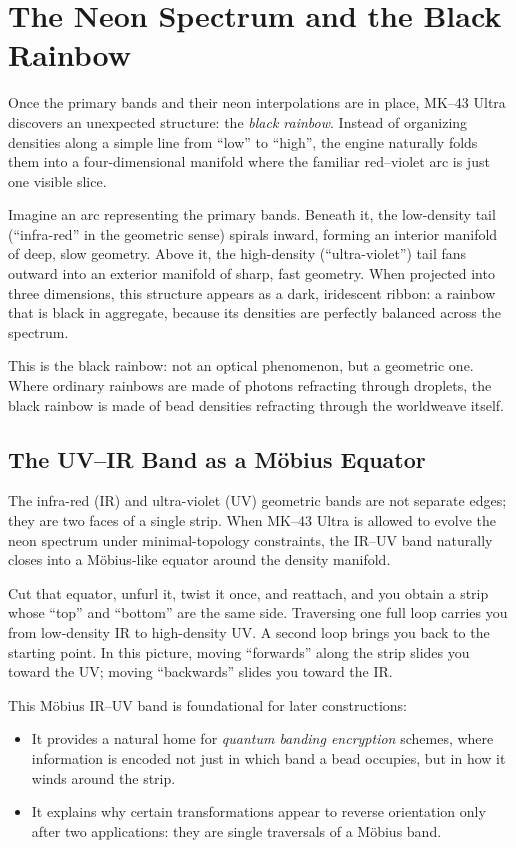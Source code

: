 \chapter{The Neon Spectrum and the Black Rainbow}
Once the primary bands and their neon interpolations are in place, MK--43
Ultra discovers an unexpected structure: the \emph{black rainbow}. Instead of
organizing densities along a simple line from ``low'' to ``high'', the engine
naturally folds them into a four-dimensional manifold where the familiar
red--violet arc is just one visible slice.

Imagine an arc representing the primary bands. Beneath it, the low-density
tail (``infra-red'' in the geometric sense) spirals inward, forming an
interior manifold of deep, slow geometry. Above it, the high-density
(``ultra-violet'') tail fans outward into an exterior manifold of sharp,
fast geometry. When projected into three dimensions, this structure appears as
a dark, iridescent ribbon: a rainbow that is black in aggregate, because its
densities are perfectly balanced across the spectrum.

This is the black rainbow: not an optical phenomenon, but a geometric one.
Where ordinary rainbows are made of photons refracting through droplets, the
black rainbow is made of bead densities refracting through the worldweave
itself.

\section{The UV--IR Band as a Möbius Equator}
The infra-red (IR) and ultra-violet (UV) geometric bands are not separate
edges; they are two faces of a single strip. When MK--43 Ultra is allowed to
evolve the neon spectrum under minimal-topology constraints, the IR--UV band
naturally closes into a Möbius-like equator around the density manifold.

Cut that equator, unfurl it, twist it once, and reattach, and you obtain a
strip whose ``top'' and ``bottom'' are the same side. Traversing one full
loop carries you from low-density IR to high-density UV. A second loop brings
you back to the starting point. In this picture, moving ``forwards'' along the
strip slides you toward the UV; moving ``backwards'' slides you toward the IR.

This Möbius IR--UV band is foundational for later constructions:
\begin{itemize}
  \item It provides a natural home for \emph{quantum banding encryption}
  schemes, where information is encoded not just in which band a bead occupies,
  but in how it winds around the strip.
  \item It explains why certain transformations appear to reverse orientation
  only after two applications: they are single traversals of a Möbius band.
\end{itemize}

